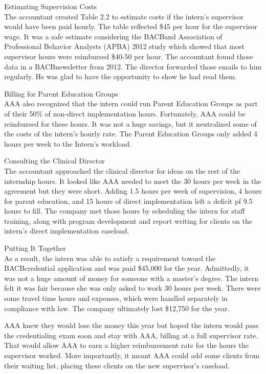 Estimating Supervision Costs\\

The accountant created Table 2.2 to estimate costs if the intern's supervisor would have been paid hourly. The table reflected \$45 per hour for the supervisor wage. It was a safe estimate considering the BACB\textregistered and Association of Professional Behavior Analysts (APBA) 2012 study which showed that most supervisor hours were reimbursed \$40-50 per hour. The accountant found those data in a BACB\textregistered newsletter from 2012. The director forwarded those emails to him regularly. He was glad to have the opportunity to show he had read them. 

Billing for Parent Education Groups\\
AAA also recognized that the intern could run Parent Education Groups as part of their 50\% of non-direct implementation hours. Fortunately, AAA could be reimbursed for these hours. It was not a huge savings, but it neutralized some of the costs of the intern's hourly rate. The Parent Education Groups only added 4 hours per week to the Intern's workload. 

Consulting the Clinical Director\\
The accountant approached the clinical director for ideas on the rest of the internship hours. It looked like AAA needed to meet the 30 hours per week in the agreement but they were short. Adding 1.5 hours per week of supervision, 4 hours for parent education, and 15 hours of direct implementation left a deficit pf 9.5 hours to fill. The company met those hours by scheduling the intern for staff training, along with program development and report writing for clients on the intern's direct implementation caseload.

Putting It Together\\
As a result, the intern was able to satisfy a requirement toward the BACB\textregistered credential application and was paid \$45,000 for the year. Admittedly, it was not a huge amount of money for someone with a master's degree. The intern felt it was fair because she was only asked to work 30 hours per week. There were some travel time hours and expenses, which were handled separately in compliance with law. The company ultimately lost \$12,750 for the year.

AAA knew they would lose the money this year but hoped the intern would pass the credentialing exam soon and stay with AAA, billing at a full supervisor rate. That would allow AAA to earn a higher reimbursement rate for the hours the supervisor worked. More importantly, it meant AAA could add some clients from their waiting list, placing these clients on the new supervisor's caseload. 

